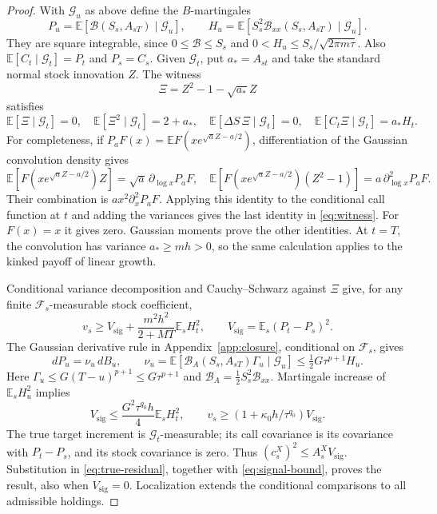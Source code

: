 \documentclass[11pt,a4paper]{amsart}
\theoremstyle{plain}
\theoremstyle{definition}
\theoremstyle{remark}
\newcommand{\EE}{\mathbb{E}}
\newcommand{\F}{\mathcal F}
\newcommand{\G}{\mathcal G}
\newcommand{\Es}{\EE_s}
\newcommand{\BS}{\mathcal B}
\newcommand{\sig}{\mathrm{sig}}
\begin{document}
\begin{proof}
With $\G_u$ as above define the $B$-martingales
\[
 P_u=\EE[\BS(S_s,A_{sT})\mid\G_u],\qquad
 H_u=\EE[S_s^2\BS_{xx}(S_s,A_{sT})\mid\G_u].
\]
They are square integrable, since $0\le\BS\le S_s$ and
$0<H_u\le S_s/\sqrt{2\pi m\tau}$. Also $\EE[C_t\mid\G_t]=P_t$ and $P_s=C_s$. Given $\G_t$, put $a_*=A_{st}$ and take the standard normal stock innovation $Z$. The witness
\[
 \Xi=Z^2-1-\sqrt{a_*}Z
\]
satisfies
\begin{equation}\label{eq:witness}
 \EE[\Xi\mid\G_t]=0,\quad
 \EE[\Xi^2\mid\G_t]=2+a_*,\quad
 \EE[\Delta S\,\Xi\mid\G_t]=0,\quad
 \EE[C_t\Xi\mid\G_t]=a_*H_t.
\end{equation}
For completeness, if $P_aF(x)=\EE F(xe^{\sqrt aZ-a/2})$, differentiation of the Gaussian convolution density gives
\[
 \EE[F(xe^{\sqrt aZ-a/2})Z]=\sqrt a\,\partial_{\log x}P_aF,
 \quad
 \EE[F(xe^{\sqrt aZ-a/2})(Z^2-1)]=a\,\partial_{\log x}^2P_aF.
\]
Their combination is $a x^2\partial_x^2P_aF$. Applying this identity to the conditional call function at $t$ and adding the variances gives the last identity in \eqref{eq:witness}. For $F(x)=x$ it gives zero. Gaussian moments prove the other identities. At $t=T$, the convolution has variance $a_*\ge mh>0$, so the same calculation applies to the kinked payoff of linear growth.

Conditional variance decomposition and Cauchy--Schwarz against $\Xi$ give, for any finite $\F_s$-measurable stock coefficient,
\begin{equation}\label{eq:hermite-variance}
 v_s\ge V_{\sig}+\frac{m^2h^2}{2+MT}\Es H_t^2,
 \qquad V_{\sig}=\Es(P_t-P_s)^2.
\end{equation}
The Gaussian derivative rule in Appendix~\ref{app:closure}, conditional on $\F_s$, gives
\[
 dP_u=\nu_u\,dB_u,\qquad
 \nu_u=\EE[\BS_A(S_s,A_{sT})\Gamma_u\mid\G_u]
 \le\tfrac12G\tau^{p+1}H_u.
\]
Here $\Gamma_u\le G(T-u)^{p+1}\le G\tau^{p+1}$ and
$\BS_A=\tfrac12 S_s^2\BS_{xx}$. Martingale increase of $\Es H_u^2$ implies
\begin{equation}\label{eq:signal-bound}
 V_{\sig}\le\frac{G^2\tau^{q_0}h}{4}\Es H_t^2,
 \qquad v_s\ge(1+\kappa_0h/\tau^{q_0})V_{\sig}.
\end{equation}
The true target increment is $\G_t$-measurable; its call covariance is its covariance with $P_t-P_s$, and its stock covariance is zero. Thus $(c_s^X)^2\le A_s^X V_{\sig}$. Substitution in \eqref{eq:true-residual}, together with \eqref{eq:signal-bound}, proves the result, also when $V_{\sig}=0$. Localization extends the conditional comparisons to all admissible holdings.
\end{proof}
\end{document}
